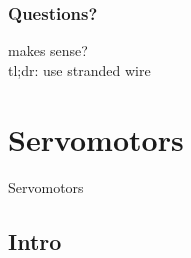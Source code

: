 \documentclass{beamer}
\begin{document}

\begin{frame}
\frametitle{Questions?}
\centering
{\huge makes sense?} \\
\vspace{20px}
\tiny{tl;dr: use stranded wire}
\end{frame}

\section{Servomotors} %
\begin{frame}
\centering \huge Servomotors
\end{frame}
\subsection{Intro}
\end{document}
